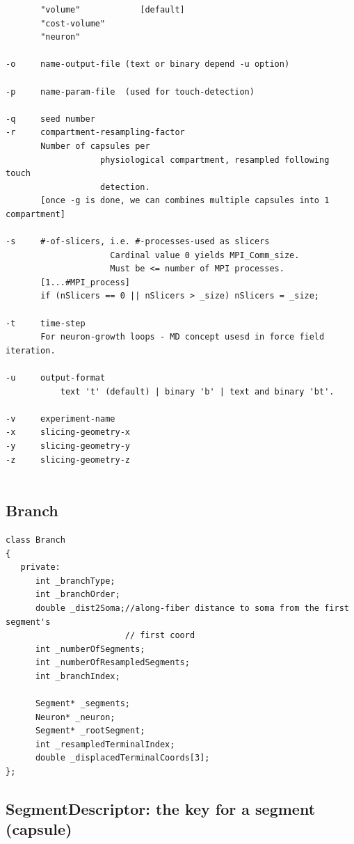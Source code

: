 \begin{verbatim}
       "volume"            [default]
       "cost-volume"
       "neuron"
       
-o     name-output-file (text or binary depend -u option)

-p     name-param-file  (used for touch-detection)

-q     seed number
-r     compartment-resampling-factor
       Number of capsules per 
                   physiological compartment, resampled following touch
                   detection.
       [once -g is done, we can combines multiple capsules into 1 compartment]

-s     #-of-slicers, i.e. #-processes-used as slicers
                     Cardinal value 0 yields MPI_Comm_size. 
                     Must be <= number of MPI processes.
       [1...#MPI_process]
       if (nSlicers == 0 || nSlicers > _size) nSlicers = _size;
       
-t     time-step
       For neuron-growth loops - MD concept usesd in force field iteration.

-u     output-format 
           text 't' (default) | binary 'b' | text and binary 'bt'.
 
-v     experiment-name
-x     slicing-geometry-x
-y     slicing-geometry-y
-z     slicing-geometry-z
  
\end{verbatim}


\subsection{Branch}
\label{sec:Branch-NTI}

\begin{lstlisting}
class Branch
{
   private:
      int _branchType;
      int _branchOrder;
      double _dist2Soma;//along-fiber distance to soma from the first segment's
                        // first coord
      int _numberOfSegments;
      int _numberOfResampledSegments;
      int _branchIndex;
      
      Segment* _segments;
      Neuron* _neuron;
      Segment* _rootSegment;
      int _resampledTerminalIndex;
      double _displacedTerminalCoords[3];
};
\end{lstlisting}

\subsection{SegmentDescriptor: the key for a segment (capsule)}
\label{sec:SegmentDescriptor}

